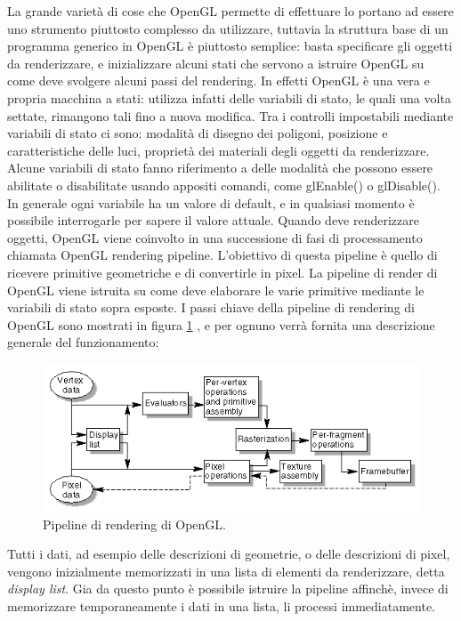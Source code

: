 La grande varietà di cose che OpenGL permette di effettuare lo portano ad essere uno strumento piuttosto complesso da utilizzare, tuttavia la struttura base di un programma generico in OpenGL è piuttosto semplice: basta specificare gli oggetti da renderizzare, e inizializzare alcuni stati che servono a istruire OpenGL su come deve svolgere alcuni passi del rendering. In effetti OpenGL è una vera e propria macchina a stati: utilizza infatti delle variabili di stato, le quali una volta settate, rimangono tali fino a nuova modifica. Tra i controlli impostabili mediante variabili di stato ci sono: modalità di disegno dei poligoni, posizione e caratteristiche delle luci, proprietà dei materiali degli oggetti da renderizzare. Alcune variabili di stato fanno riferimento a delle modalità che possono essere abilitate o disabilitate usando appositi comandi, come glEnable() o glDisable(). In generale ogni variabile ha un valore di default, e in qualsiasi momento è possibile interrogarle per sapere il valore attuale.
Quando deve renderizzare oggetti, OpenGL viene coinvolto in una successione di fasi di processamento chiamata OpenGL rendering pipeline. L’obiettivo di questa pipeline è quello di ricevere primitive geometriche e di convertirle in pixel. La pipeline di render di OpenGL viene istruita su come deve elaborare le varie primitive mediante le variabili di stato sopra esposte.
I passi chiave della pipeline di rendering di OpenGL sono mostrati in figura \ref{fig:stato_arte_opengl_pipeline} , e per ognuno verrà fornita una descrizione generale del funzionamento:
\\
\begin{figure}[htb]
 \centering
 \includegraphics[width=0.8\linewidth]{images/chapter_stato_arte/stato_arte_opengl_pipeline.png}\hfill
 \caption[Pipeline di rendering di OpenGL]{Pipeline di rendering di OpenGL.}
 \label{fig:stato_arte_opengl_pipeline}
\end{figure}

Tutti i dati, ad esempio delle descrizioni di geometrie, o delle descrizioni di pixel, vengono inizialmente memorizzati in una lista di elementi da renderizzare, detta \emph{display list}. Gia da questo punto è possibile istruire la pipeline affinchè, invece di memorizzare temporaneamente i dati in una lista, li processi immediatamente. 

